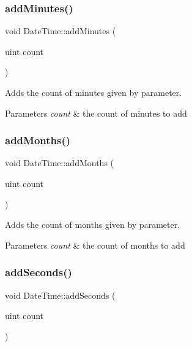 \subsubsection{\texorpdfstring{addMinutes()}{addMinutes()}}
{\footnotesize\ttfamily void Date\+Time\+::add\+Minutes (\begin{DoxyParamCaption}\item[{uint}]{count }\end{DoxyParamCaption})}



Adds the count of minutes given by parameter. 


\begin{DoxyParams}{Parameters}
{\em count} & the count of minutes to add \\
\hline
\end{DoxyParams}
\mbox{\label{class_date_time_a07122467e69f11dd79a615af9c5097d1}} 
\subsubsection{\texorpdfstring{addMonths()}{addMonths()}}
{\footnotesize\ttfamily void Date\+Time\+::add\+Months (\begin{DoxyParamCaption}\item[{uint}]{count }\end{DoxyParamCaption})}



Adds the count of months given by parameter. 


\begin{DoxyParams}{Parameters}
{\em count} & the count of months to add \\
\hline
\end{DoxyParams}
\mbox{\label{class_date_time_a79bda8c555092ea62255498f86a07655}} 
\subsubsection{\texorpdfstring{addSeconds()}{addSeconds()}}
{\footnotesize\ttfamily void Date\+Time\+::add\+Seconds (\begin{DoxyParamCaption}\item[{uint}]{count }\end{DoxyParamCaption})}



